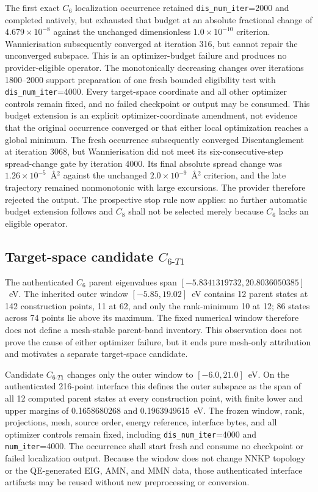 \documentclass[11pt]{article}
\begin{document}
The first exact $C_6$ localization occurrence retained
\texttt{dis\_num\_iter}=2000 and completed natively, but exhausted that budget at an
absolute fractional change of $4.679\times10^{-8}$ against the unchanged dimensionless
$1.0\times10^{-10}$ criterion.  Wannierisation subsequently converged at iteration 316,
but cannot repair the unconverged subspace.  This is an optimizer-budget failure and
produces no provider-eligible operator.  The monotonically decreasing changes over
iterations 1800--2000 support preparation of one fresh bounded eligibility test with
\texttt{dis\_num\_iter}=4000.  Every target-space coordinate and all other optimizer
controls remain fixed, and no failed checkpoint or output may be consumed.  This budget
extension is an explicit optimizer-coordinate amendment, not evidence that the original
occurrence converged or that either local optimization reaches a global minimum.  The
fresh occurrence subsequently converged Disentanglement at iteration 3068, but
Wannierisation did not meet its six-consecutive-step spread-change gate by iteration
4000.  Its final absolute spread change was $1.26\times10^{-5}$~\AA$^2$ against the
unchanged $2.0\times10^{-9}$~\AA$^2$ criterion, and the late trajectory remained
nonmonotonic with large excursions.  The provider therefore rejected the output.  The
prospective stop rule now applies: no further automatic budget extension follows and
$C_8$ shall not be selected merely because $C_6$ lacks an eligible operator.

\subsection{Target-space candidate \texorpdfstring{$C_{6\text{-}T1}$}{C6-T1}}

The authenticated $C_6$ parent eigenvalues span
$[-5.8341319732,20.8036050385]$~eV.  The inherited outer window
$[-5.85,19.02]$~eV contains 12 parent states at 142 construction points, 11 at 62,
and only the rank-minimum 10 at 12; 86 states across 74 points lie above its maximum.
The fixed numerical window therefore does not define a mesh-stable parent-band
inventory.  This observation does not prove the cause of either optimizer failure, but
it ends pure mesh-only attribution and motivates a separate target-space candidate.

Candidate $C_{6\text{-}T1}$ changes only the outer window to
$[-6.0,21.0]$~eV.  On the authenticated 216-point interface this defines the outer
subspace as the span of all 12 computed parent states at every construction point, with
finite lower and upper margins of 0.1658680268 and 0.1963949615~eV.  The frozen window,
rank, projections, mesh, source order, energy reference, interface bytes, and all
optimizer controls remain fixed, including \texttt{dis\_num\_iter}=4000 and
\texttt{num\_iter}=4000.  The occurrence shall start fresh and consume no checkpoint or
failed localization output.  Because the window does not change NNKP topology or the
QE-generated EIG, AMN, and MMN data, those authenticated interface artifacts may be
reused without new preprocessing or conversion.
\end{document}
